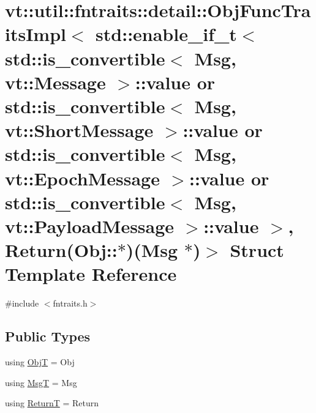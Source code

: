 \hypertarget{structvt_1_1util_1_1fntraits_1_1detail_1_1_obj_func_traits_impl_3_01std_1_1enable__if__t_3_01std50180eda0449a3437a18b4857773a769}{}\section{vt\+:\+:util\+:\+:fntraits\+:\+:detail\+:\+:Obj\+Func\+Traits\+Impl$<$ std\+:\+:enable\+\_\+if\+\_\+t$<$ std\+:\+:is\+\_\+convertible$<$ Msg, vt\+:\+:Message $>$\+:\+:value or std\+:\+:is\+\_\+convertible$<$ Msg, vt\+:\+:Short\+Message $>$\+:\+:value or std\+:\+:is\+\_\+convertible$<$ Msg, vt\+:\+:Epoch\+Message $>$\+:\+:value or std\+:\+:is\+\_\+convertible$<$ Msg, vt\+:\+:Payload\+Message $>$\+:\+:value $>$, Return(Obj\+:\+:$\ast$)(Msg $\ast$)$>$ Struct Template Reference}
\label{structvt_1_1util_1_1fntraits_1_1detail_1_1_obj_func_traits_impl_3_01std_1_1enable__if__t_3_01std50180eda0449a3437a18b4857773a769}


{\ttfamily \#include $<$fntraits.\+h$>$}

\subsection*{Public Types}
\begin{DoxyCompactItemize}
\item 
using \hyperlink{structvt_1_1util_1_1fntraits_1_1detail_1_1_obj_func_traits_impl_3_01std_1_1enable__if__t_3_01std50180eda0449a3437a18b4857773a769_ab9983bec45f1fd83ddfb425a7678428e}{ObjT} = Obj
\item 
using \hyperlink{structvt_1_1util_1_1fntraits_1_1detail_1_1_obj_func_traits_impl_3_01std_1_1enable__if__t_3_01std50180eda0449a3437a18b4857773a769_a319c70f1ad557eb4e19c487347c6e0e3}{MsgT} = Msg
\item 
using \hyperlink{structvt_1_1util_1_1fntraits_1_1detail_1_1_obj_func_traits_impl_3_01std_1_1enable__if__t_3_01std50180eda0449a3437a18b4857773a769_a69f2ec9b28dae0886f5622cdcb9c0b10}{ReturnT} = Return
\end{DoxyCompactItemize}
